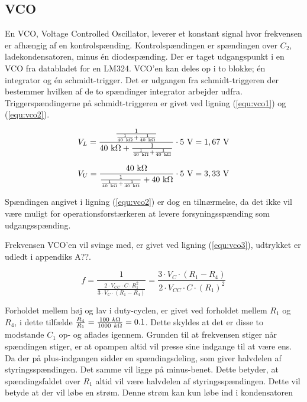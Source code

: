 \subsection*{VCO}
\label{volumenkontrol-vco}

En VCO, Voltage Controlled Oscillator, leverer et konstant signal hvor frekvensen er afhængig af en kontrolspænding. Kontrolspændingen er spændingen over $C_2$, ladekondensatoren, minus én diodespænding. Der er taget udgangspunkt i en VCO fra databladet for en LM324. VCO'en kan deles op i to blokke; én integrator og én schmidt-trigger. Det er udgangen fra schmidt-triggeren der bestemmer hvilken af de to spændinger integrator arbejder udfra. Triggerspændingerne på schmidt-triggeren er givet ved ligning (\ref{equ:vco1}) og (\ref{equ:vco2}). 

\begin{equation}
\label{equ:vco1}
V_L = \mathrm{\frac{\frac{1}{\frac{1}{40~k\ohm} + \frac{1}{40~k\ohm}}}{40~k\ohm + \frac{1}{\frac{1}{40~k\ohm} + \frac{1}{40~k\ohm}}} \cdot 5~V = 1,67~V}
\end{equation}

\begin{equation}
\label{equ:vco2}
V_U = \mathrm{\frac{40~k\ohm}{\frac{1}{\frac{1}{40~k\ohm} + \frac{1}{40~k\ohm}} + 40~k\ohm} \cdot 5~V = 3,33~V}
\end{equation}

Spændingen angivet i ligning (\ref{equ:vco2}) er dog en tilnærmelse, da det ikke vil være muligt for operationsforstærkeren at levere forsyningsspænding som udgangsspænding.

Frekvensen VCO'en vil svinge med, er givet ved ligning (\ref{equ:vco3}), udtrykket er udledt i appendiks A??.

\begin{equation}
\label{equ:vco3}
f = \frac{1}{\frac{2 \cdot V_{CC} \cdot C \cdot R_1^2}{3 \cdot V_C \cdot (R_1 - R_4)}} = \frac{3 \cdot V_C \cdot (R_1 - R_4)}{2 \cdot V_{CC} \cdot C \cdot (R_1)^2}
\end{equation}

Forholdet mellem høj og lav i duty-cyclen, er givet ved forholdet mellem $R_1$ og $R_4$, i dette tilfælde $\frac{R_4}{R_1} = \frac{100~k\ohm}{1000~k\ohm}=0.1$. Dette skyldes at det er disse to modstande $C_1$ op- og aflades igennem.  Grunden til at frekvensen stiger når spændingen stiger, er at opampen altid vil presse sine indgange til at være ens. Da der på plus-indgangen sidder en spændingsdeling, som giver halvdelen af styringsspændingen. Det samme vil ligge på minus-benet. Dette betyder, at spændingsfaldet over $R_1$ altid vil være halvdelen af styringsspændingen. Dette vil betyde at der vil løbe en strøm. Denne strøm kan kun løbe ind i kondensatoren


